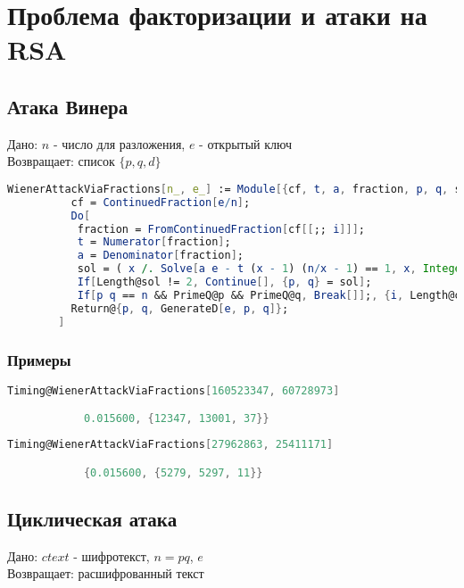 
\chapter{Проблема факторизации и атаки на RSA}

	\section{Атака Винера}
		Дано: $n$ - число для разложения, $e$ - открытый ключ \\
		Возвращает: список $\{p, q, d\}$

		\begin{lstlisting}[language=Mathematica,caption={
      		Атака Винера
    	}]
		WienerAttackViaFractions[n_, e_] := Module[{cf, t, a, fraction, p, q, sol},
		  cf = ContinuedFraction[e/n];
		  Do[
		   fraction = FromContinuedFraction[cf[[;; i]]];
		   t = Numerator[fraction];
		   a = Denominator[fraction];
		   sol = ( x /. Solve[a e - t (x - 1) (n/x - 1) == 1, x, Integers]);
		   If[Length@sol != 2, Continue[], {p, q} = sol];
		   If[p q == n && PrimeQ@p && PrimeQ@q, Break[]];, {i, Length@cf}];
	  	  Return@{p, q, GenerateD[e, p, q]};
  		]
    	\end{lstlisting}

    	\subsection{Примеры}

	    	\begin{lstlisting}[language=Mathematica,caption={
	      		Пример 1
	    	}]
			Timing@WienerAttackViaFractions[160523347, 60728973]

			0.015600, {12347, 13001, 37}}
	    	\end{lstlisting}

	    	\begin{lstlisting}[language=Mathematica,caption={
	      		Пример 2
	    	}]
			Timing@WienerAttackViaFractions[27962863, 25411171]

			{0.015600, {5279, 5297, 11}}
	    	\end{lstlisting}

	\section{Циклическая атака}
		Дано: $ctext$ - шифротекст, $n=p q$, $e$ \\
		Возвращает: расшифрованный текст

